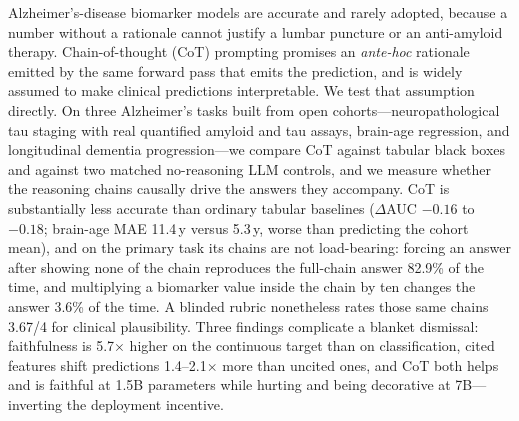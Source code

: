 Alzheimer's-disease biomarker models are accurate and rarely adopted, because a number without a
rationale cannot justify a lumbar puncture or an anti-amyloid therapy. Chain-of-thought (CoT)
prompting promises an \emph{ante-hoc} rationale emitted by the same forward pass that emits the
prediction, and is widely assumed to make clinical predictions interpretable. We test that
assumption directly. On three Alzheimer's tasks built from open cohorts---neuropathological tau
staging with real quantified amyloid and tau assays, brain-age regression, and longitudinal
dementia progression---we compare CoT against tabular black boxes and against two matched
no-reasoning LLM controls, and we measure whether the reasoning chains causally drive the answers
they accompany. CoT is substantially less accurate than ordinary tabular baselines
($\Delta$AUC $-0.16$ to $-0.18$; brain-age MAE 11.4\,y versus 5.3\,y, worse than predicting the
cohort mean), and on the primary task its chains are not load-bearing: forcing an answer after
showing none of the chain reproduces the full-chain answer 82.9\% of the time, and multiplying a
biomarker value inside the chain by ten changes the answer 3.6\% of the time. A blinded rubric
nonetheless rates those same chains 3.67/4 for clinical plausibility. Three findings complicate a
blanket dismissal: faithfulness is 5.7$\times$ higher on the continuous target than on
classification, cited features shift predictions 1.4--2.1$\times$ more than uncited ones, and CoT
both helps and is faithful at 1.5B parameters while hurting and being decorative at 7B---inverting
the deployment incentive.
